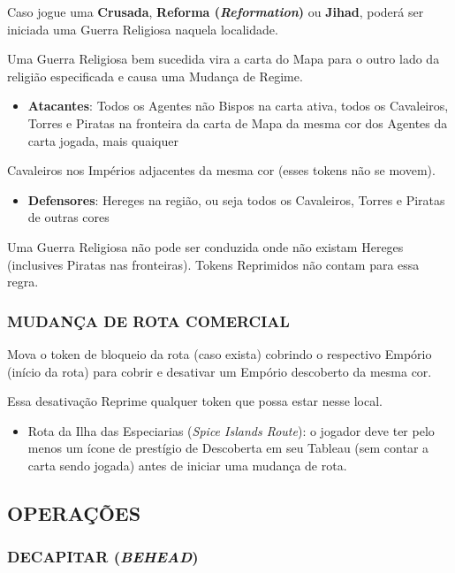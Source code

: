 \documentclass[11pt]{article}
\begin{document}
Caso jogue uma \textbf{Crusada}, \textbf{Reforma (\emph{Reformation})} ou \textbf{Jihad}, poderá ser iniciada uma Guerra Religiosa naquela localidade.

Uma Guerra Religiosa bem sucedida vira a carta do Mapa para o outro lado da religião especificada e causa uma Mudança de Regime.

\begin{itemize}
\item \textbf{Atacantes}: Todos os Agentes não Bispos na carta ativa, todos os Cavaleiros, Torres e Piratas na fronteira da carta de Mapa da mesma cor dos Agentes da carta jogada, mais quaiquer
\end{itemize}
Cavaleiros nos Impérios adjacentes da mesma cor (esses tokens não se movem).

\begin{itemize}
\item \textbf{Defensores}: Hereges na região, ou seja todos os Cavaleiros, Torres e Piratas de outras cores
\end{itemize}

Uma Guerra Religiosa não pode ser conduzida onde não existam Hereges (inclusives Piratas nas fronteiras). Tokens Reprimidos não contam para essa regra.


\subsubsection{MUDANÇA DE ROTA COMERCIAL}
\label{sec:org8d80dfe}

Mova o token de bloqueio da rota (caso exista) cobrindo o respectivo Empório (início da rota) para cobrir e desativar um Empório descoberto da mesma cor.

Essa desativação Reprime qualquer token que possa estar nesse local.

\begin{itemize}
\item Rota da Ilha das Especiarias (\emph{Spice Islands Route}): o jogador deve ter pelo menos um ícone de prestígio de Descoberta em seu Tableau (sem contar a carta sendo jogada) antes de iniciar uma mudança de rota.
\end{itemize}

\subsection{OPERAÇÕES}
\label{sec:org86292a6}

\subsubsection{DECAPITAR (\emph{BEHEAD})}
\label{sec:orgafec22d}
\end{document}
